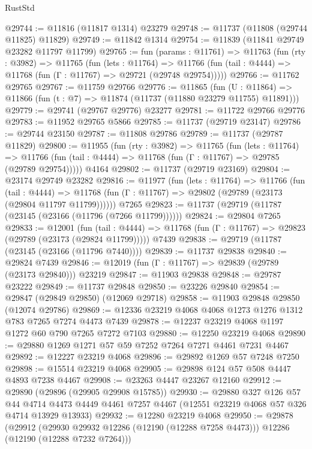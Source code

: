 \begin{lexlean}{RustStd}
\begin{coremodule}
@29744 := @11816 (@11817 @1314) @23279
@29748 := @11737 (@11808 (@29744 @11825) @11829)
@29749 := @11842 @1314
@29754 := @11839 (@11841 @29749 @23282 @11797 @11799)
@29765 := fun (params : @11761) =>
  @11763
    (fun (rty : @3982) =>
    @11765
      (fun (lets : @11764) =>
      @11766 (fun (tail : @4444) => @11768 (fun (Γ : @11767) => @29721 (@29748 @29754)))))
@29766 := @11762 @29765
@29767 := @11759 @29766
@29776 := @11865
    (fun (U : @11864) => @11866 (fun (t : @7) => @11874 (@11737 (@11880 @23279 @11755) @11891)))
@29779 := @29741 (@29767 @29776) @23277
@29781 := @11722 @29766 @29776
@29783 := @11952 @29765 @5866
@29785 := @11737 (@29719 @23147)
@29786 := @29744 @23150
@29787 := @11808 @29786
@29789 := @11737 (@29787 @11829)
@29800 := @11955
    (fun (rty : @3982) =>
    @11765
      (fun (lets : @11764) =>
      @11766 (fun (tail : @4444) => @11768 (fun (Γ : @11767) => @29785 (@29789 @29754)))))
    @4164
@29802 := @11737 (@29719 @23169)
@29804 := @23174 @29749 @23282
@29816 := @11977
    (fun (lets : @11764) =>
    @11766
      (fun (tail : @4444) =>
      @11768 (fun (Γ : @11767) => @29802 (@29789 (@23173 (@29804 @11797 @11799))))))
    @7265
@29823 := @11737 (@29719 (@11787 (@23145 (@23166 (@11796 (@7266 @11799))))))
@29824 := @29804 @7265
@29833 := @12001
    (fun (tail : @4444) => @11768 (fun (Γ : @11767) => @29823 (@29789 (@23173 (@29824 @11799)))))
    @7439
@29838 := @29719 (@11787 (@23145 (@23166 (@11796 @7440))))
@29839 := @11737 @29838
@29840 := @29824 @7439
@29846 := @12019 (fun (Γ : @11767) => @29839 (@29789 (@23173 @29840))) @23219
@29847 := @11903 @29838
@29848 := @29787 @23222
@29849 := @11737 @29848
@29850 := @23226 @29840
@29854 := @29847 (@29849 @29850) (@12069 @29718)
@29858 := @11903 @29848 @29850 (@12074 @29786)
@29869 := @12336 @23219 @4068 @4068 @1273 @1276 @1312 @783 @7265 @7274 @4473 @7439
@29878 := @12237 @23219 @4068 @1197 @1272 @60 @790 @7265 @7272 @7103
@29880 := @12250 @23219 @4068
@29890 := @29880 @1269 @1271 @57 @59 @7252 @7264 @7271 @4461 @7231 @4467
@29892 := @12227 @23219 @4068
@29896 := @29892 @1269 @57 @7248 @7250
@29898 := @15514 @23219 @4068
@29905 := @29898 @124 @57 @508 @4447 @4893 @7238 @4467
@29908 := @23263 @4447 @23267 @12160
@29912 := @29890 (@29896 (@29905 @29908 @15785))
@29930 := @29880
    @327
    @126
    @57
    @44
    @4714
    @4473
    @4449
    @4461
    @7257
    @4467
    (@12551 @23219 @4068 @57 @326 @4714 @13929 @13933)
@29932 := @12280 @23219 @4068
@29950 := @29878
    (@29912
      (@29930 @29932 @12286 (@12190 (@12288 @7258 @4473)))
      @12286
      (@12190 (@12288 @7232 @7264)))

\end{coremodule}
\end{lexlean}
